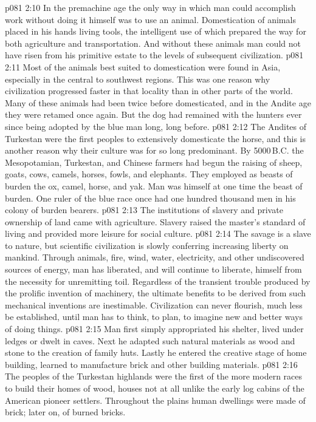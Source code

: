 \vs p081 2:10 \pc In the premachine age the only way in which man could accomplish work without doing it himself was to use an animal. Domestication of animals placed in his hands living tools, the intelligent use of which prepared the way for both agriculture and transportation. And without these animals man could not have risen from his primitive estate to the levels of subsequent civilization.
\vs p081 2:11 Most of the animals best suited to domestication were found in Asia, especially in the central to southwest regions. This was one reason why civilization progressed faster in that locality than in other parts of the world. Many of these animals had been twice before domesticated, and in the Andite age they were retamed once again. But the dog had remained with the hunters ever since being adopted by the blue man long, long before.
\vs p081 2:12 The Andites of Turkestan were the first peoples to extensively domesticate the horse, and this is another reason why their culture was for so long predominant. By 5000\,B.C. the Mesopotamian, Turkestan, and Chinese farmers had begun the raising of sheep, goats, cows, camels, horses, fowls, and elephants. They employed as beasts of burden the ox, camel, horse, and yak. Man was himself at one time the beast of burden. One ruler of the blue race once had one hundred thousand men in his colony of burden bearers.
\vs p081 2:13 \pc The institutions of slavery and private ownership of land came with agriculture. Slavery raised the master’s standard of living and provided more leisure for social culture.
\vs p081 2:14 The savage is a slave to nature, but scientific civilization is slowly conferring increasing liberty on mankind. Through animals, fire, wind, water, electricity, and other undiscovered sources of energy, man has liberated, and will continue to liberate, himself from the necessity for unremitting toil. Regardless of the transient trouble produced by the prolific invention of machinery, the ultimate benefits to be derived from such mechanical inventions are inestimable. Civilization can never flourish, much less be established, until man has  to think, to plan, to imagine new and better ways of doing things.
\vs p081 2:15 \pc Man first simply appropriated his shelter, lived under ledges or dwelt in caves. Next he adapted such natural materials as wood and stone to the creation of family huts. Lastly he entered the creative stage of home building, learned to manufacture brick and other building materials.
\vs p081 2:16 The peoples of the Turkestan highlands were the first of the more modern races to build their homes of wood, houses not at all unlike the early log cabins of the American pioneer settlers. Throughout the plains human dwellings were made of brick; later on, of burned bricks.
